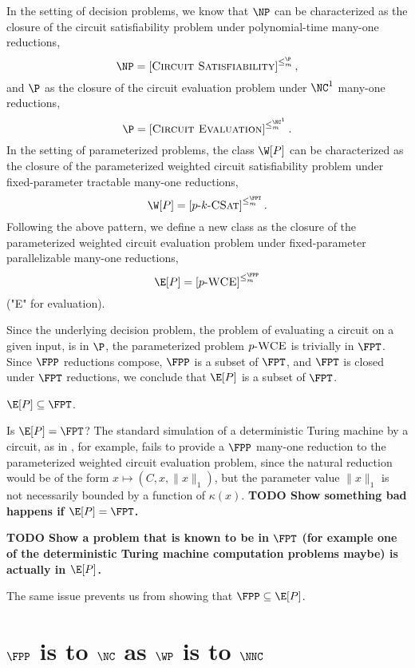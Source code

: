 \documentclass{article}
\newcommand{\todo}[1]{\textbf{TODO #1}}
\newcommand{\dash}{\textnormal{-}}
\newcommand{\pCkSAT}{p \dash k \dash \textsc{CSat}}
\newcommand{\pWCE}{p \dash \textsc{WCE}}
\newcommand{\cl}[1]{\left[{#1}\right]}
\begin{document}
In the setting of decision problems, we know that $\NP$ can be characterized as the closure of the circuit satisfiability problem under polynomial-time many-one reductions,
\[
\NP = \cl{\textsc{Circuit Satisfiability}}^{\leq_m^\P},
\]
and $\P$ as the closure of the circuit evaluation problem under $\NC^1$ many-one reductions,
\[
\P = \cl{\textsc{Circuit Evaluation}}^{\leq_m^{\NC^1}}.
\]
In the setting of parameterized problems, the class $\W[P]$ can be characterized as the closure of the parameterized weighted circuit satisfiability problem under fixed-parameter tractable many-one reductions,
\[
\W[P] = \cl{\pCkSAT}^{\leq_m^{\FPT}}.
\]
Following the above pattern, we define a new class as the closure of the parameterized weighted circuit evaluation problem under fixed-parameter parallelizable many-one reductions,
\[
\E[P] = \cl{\pWCE}^{\leq_m^{\FPP}}
\]
("E" for evaluation).

Since the underlying decision problem, the problem of evaluating a circuit on a given input, is in $\P$, the parameterized problem $\pWCE$ is trivially in $\FPT$.
Since $\FPP$ reductions compose, $\FPP$ is a subset of $\FPT$, and $\FPT$ is closed under $\FPT$ reductions, we conclude that $\E[P]$ is a subset of $\FPT$.

\begin{theorem}
  $\E[P] \subseteq \FPT$.
\end{theorem}

Is $\E[P] = \FPT$?
The standard simulation of a deterministic Turing machine by a circuit, as in \autocite{ladner75}, for example, fails to provide a $\FPP$ many-one reduction to the parameterized weighted circuit evaluation problem, since the natural reduction would be of the form $x \mapsto (C, x, \|x\|_1)$, but the parameter value $\|x\|_1$ is not necessarily bounded by a function of $\kappa(x)$.
\todo{Show something bad happens if $\E[P] = \FPT$.}

\todo{Show a problem that is known to be in $\FPT$ (for example one of the deterministic Turing machine computation problems maybe) is actually in $\E[P]$.}

The same issue prevents us from showing that $\FPP \subseteq \E[P]$.

\section{\texorpdfstring{$\FPP$}{FPP} is to \texorpdfstring{$\NC$}{NC} as \texorpdfstring{$\WP$}{WP} is to \texorpdfstring{$\NNC$}{NNC}}
\end{document}
